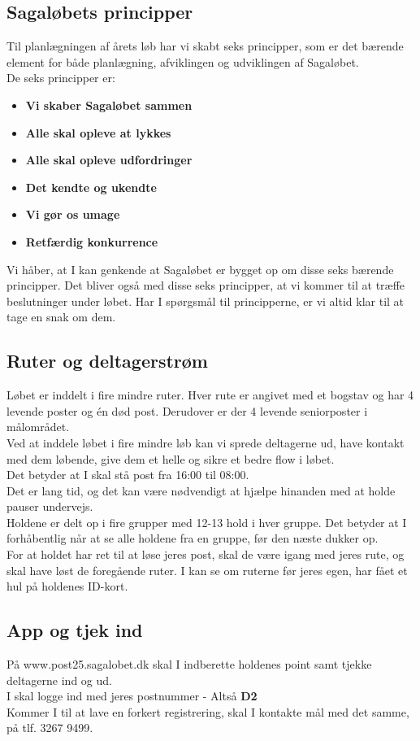 \subsection{Sagaløbets principper}
Til planlægningen af årets løb har vi skabt seks principper, som er det bærende element for både planlægning, afviklingen og udviklingen af Sagaløbet.\\
De seks principper er:
\begin{itemize}
  \item \textbf{Vi skaber Sagaløbet sammen}
  \item \textbf{Alle skal opleve at lykkes}
  \item \textbf{Alle skal opleve udfordringer}
  \item \textbf{Det kendte og ukendte}
  \item \textbf{Vi gør os umage}
  \item \textbf{Retfærdig konkurrence}
\end{itemize}
Vi håber, at I kan genkende at Sagaløbet er bygget op om disse seks bærende principper. Det bliver også med disse seks principper, at vi kommer til at træffe beslutninger under løbet. Har I spørgsmål til principperne, er vi altid klar til at tage en snak om dem.
\subsection{Ruter og deltagerstrøm}
Løbet er inddelt i fire mindre ruter. Hver rute er angivet med et bogstav og har 4 levende poster og én død post. Derudover er der 4 levende seniorposter i målområdet.\\
Ved at inddele løbet i fire mindre løb kan vi sprede deltagerne ud, have kontakt med dem løbende, give dem et helle og sikre et bedre flow i løbet.\\
\newline
Det betyder at I skal stå post fra 16:00 til 08:00.\\
Det er lang tid, og det kan være nødvendigt at hjælpe hinanden med at holde pauser undervejs.\\
\newline
Holdene er delt op i fire grupper med 12-13 hold i hver gruppe. Det betyder at I forhåbentlig når at se alle holdene fra en gruppe, før den næste dukker op.\\
For at holdet har ret til at løse jeres post, skal de være igang med jeres rute, og skal have løst de foregående ruter. I kan se om ruterne før jeres egen, har fået et hul på holdenes ID-kort.
\subsection{App og tjek ind}
På www.post25.sagalobet.dk skal I indberette holdenes point samt tjekke deltagerne ind og ud.\\
I skal logge ind med jeres postnummer - Altså \textbf{D2}\\
\newline
Kommer I til at lave en forkert registrering, skal I kontakte mål med det samme, på tlf. 3267 9499.
\newpage
\vspace*{.4cm}
